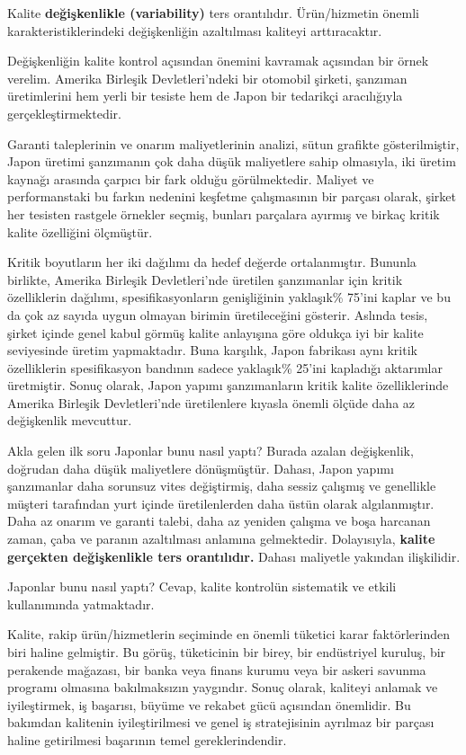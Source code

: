 \documentclass[
]{book}
\begin{document}
Kalite \textbf{değişkenlikle (variability)} ters orantılıdır. Ürün/hizmetin önemli karakteristiklerindeki değişkenliğin azaltılması kaliteyi arttıracaktır.

Değişkenliğin kalite kontrol açısından önemini kavramak açısından bir örnek verelim. Amerika Birleşik Devletleri'ndeki bir otomobil şirketi, şanzıman üretimlerini hem yerli bir tesiste hem de Japon bir tedarikçi aracılığıyla gerçekleştirmektedir.

Garanti taleplerinin ve onarım maliyetlerinin analizi, sütun grafikte gösterilmiştir, Japon üretimi şanzımanın çok daha düşük maliyetlere sahip olmasıyla, iki üretim kaynağı arasında çarpıcı bir fark olduğu görülmektedir. Maliyet ve performanstaki bu farkın nedenini keşfetme çalışmasının bir parçası olarak, şirket her tesisten rastgele örnekler seçmiş, bunları parçalara ayırmış ve birkaç kritik kalite özelliğini ölçmüştür.

Kritik boyutların her iki dağılımı da hedef değerde ortalanmıştır. Bununla birlikte, Amerika Birleşik Devletleri'nde üretilen şanzımanlar için kritik özelliklerin dağılımı, spesifikasyonların genişliğinin yaklaşık\% 75'ini kaplar ve bu da çok az sayıda uygun olmayan birimin üretileceğini gösterir. Aslında tesis, şirket içinde genel kabul görmüş kalite anlayışına göre oldukça iyi bir kalite seviyesinde üretim yapmaktadır. Buna karşılık, Japon fabrikası aynı kritik özelliklerin spesifikasyon bandının sadece yaklaşık\% 25'ini kapladığı aktarımlar üretmiştir. Sonuç olarak, Japon yapımı şanzımanların kritik kalite özelliklerinde Amerika Birleşik Devletleri'nde üretilenlere kıyasla önemli ölçüde daha az değişkenlik mevcuttur.

Akla gelen ilk soru Japonlar bunu nasıl yaptı? Burada azalan değişkenlik, doğrudan daha düşük maliyetlere dönüşmüştür. Dahası, Japon yapımı şanzımanlar daha sorunsuz vites değiştirmiş, daha sessiz çalışmış ve genellikle müşteri tarafından yurt içinde üretilenlerden daha üstün olarak algılanmıştır. Daha az onarım ve garanti talebi, daha az yeniden çalışma ve boşa harcanan zaman, çaba ve paranın azaltılması anlamına gelmektedir. Dolayısıyla, \textbf{kalite gerçekten değişkenlikle ters orantılıdır.} Dahası maliyetle yakından ilişkilidir.

Japonlar bunu nasıl yaptı? Cevap, kalite kontrolün sistematik ve etkili kullanımında yatmaktadır.

Kalite, rakip ürün/hizmetlerin seçiminde en önemli tüketici karar faktörlerinden biri haline gelmiştir. Bu görüş, tüketicinin bir birey, bir endüstriyel kuruluş, bir perakende mağazası, bir banka veya finans kurumu veya bir askeri savunma programı olmasına bakılmaksızın yaygındır. Sonuç olarak, kaliteyi anlamak ve iyileştirmek, iş başarısı, büyüme ve rekabet gücü açısından önemlidir. Bu bakımdan kalitenin iyileştirilmesi ve genel iş stratejisinin ayrılmaz bir parçası haline getirilmesi başarının temel gereklerindendir.
\end{document}
